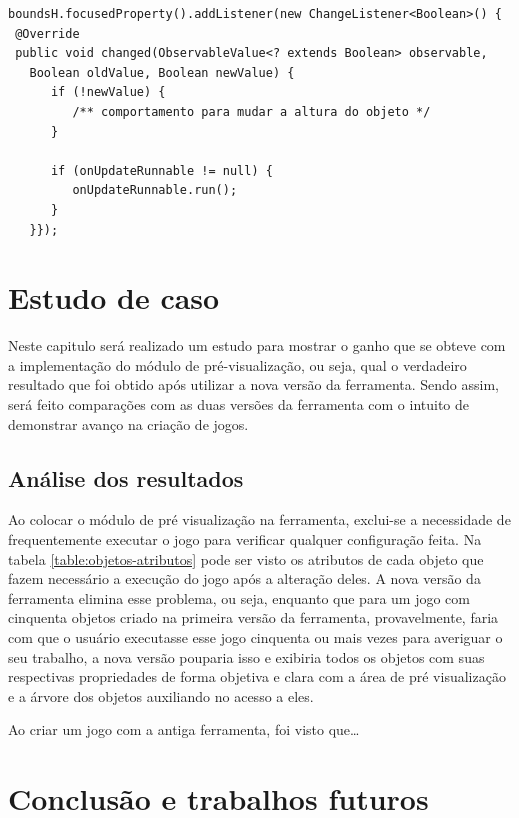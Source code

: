 \documentclass[12pt,oneside,openright,a4paper,english,brazil,sumario=tradicional]{abntex2}
\begin{document}
\begin{mylisting}[h]
\begin{lstlisting}
boundsH.focusedProperty().addListener(new ChangeListener<Boolean>() {
 @Override
 public void changed(ObservableValue<? extends Boolean> observable,
   Boolean oldValue, Boolean newValue) {
      if (!newValue) {
         /** comportamento para mudar a altura do objeto */
      }

      if (onUpdateRunnable != null) {
         onUpdateRunnable.run();
      }
   }});
\end{lstlisting}
\end{mylisting}


\chapter{Estudo de caso}
\label{chap:caso}

Neste capitulo será realizado um estudo para mostrar o ganho que se obteve com a implementação do módulo de pré-visualização, ou seja, qual o verdadeiro resultado que foi obtido após utilizar a nova versão da ferramenta. Sendo assim, será feito comparações com as duas versões da ferramenta com o intuito de demonstrar avanço na criação de jogos.

\section{Análise dos resultados}



Ao colocar o módulo de pré visualização na ferramenta, exclui-se a necessidade de frequentemente executar o jogo para verificar qualquer configuração feita. Na tabela \ref{table:objetos-atributos} pode ser visto os atributos de cada objeto que fazem necessário a execução do jogo após a alteração deles. A nova versão da ferramenta elimina esse problema, ou seja, enquanto que para um jogo com cinquenta objetos criado na primeira versão da ferramenta, provavelmente, faria com que o usuário executasse esse jogo cinquenta ou mais vezes para averiguar o seu trabalho, a nova versão pouparia isso e exibiria todos os objetos com suas respectivas propriedades de forma objetiva e clara com a área de pré visualização e a árvore dos objetos auxiliando no acesso a eles.

Ao criar um jogo com a antiga ferramenta, foi visto que\ldots


\chapter{Conclusão e trabalhos futuros}
\label{chap:conclcsao}
\end{document}
